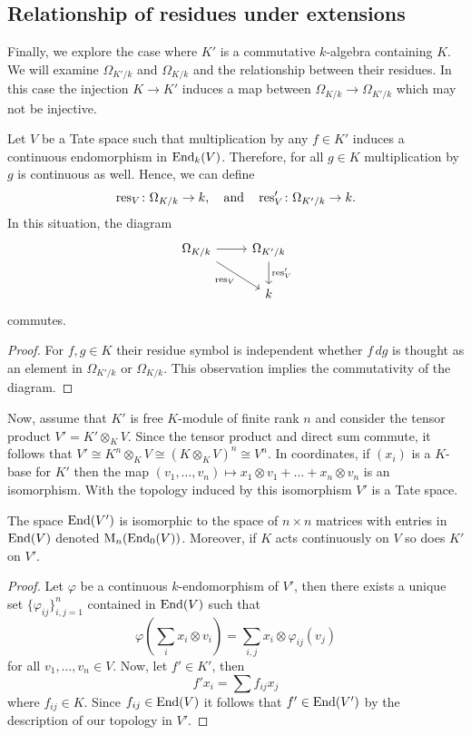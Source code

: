 \subsection{Relationship of residues under extensions}
Finally, we explore the case where $K'$ is a commutative $k$-algebra containing $K$. We will examine $\Omega_{K'/k}$ and $\Omega_{K/k}$ and the relationship between their residues. In this case the injection $K \to K'$ induces a map between $\Omega_{K/k} \to \Omega_{K'/k}$ which may not be injective. 
\begin{proposition}\label{prop:residue-commutes-extension}
	Let $V$ be a Tate space such that multiplication by any $f\in K'$ induces a continuous endomorphism in $\operatorname{End}_{k}(V)$. Therefore, for all $g\in K$ multiplication by $g$ is continuous as well. Hence, we can define
\[
	\operatorname{res}_{V}\colon\Omega_{K/k} \to k, \quad\text{and}\quad \operatorname{res}_{V}'\colon \Omega_{K'/k}\to k.
\]
In this situation, the diagram
\[
\begin{tikzcd}
	\Omega_{K/k} \arrow[r] \arrow[dr, swap, "\res_{V}"] & \Omega_{K'/k} \arrow[d, "\res_{V}'"] \\
	& k  
\end{tikzcd}
\]
commutes.
\end{proposition}
\begin{proof}
	For $f,g \in K$ their residue symbol is independent whether $f\,dg$ is thought as an element in $\Omega_{K'/k}$ or $\Omega_{K/k}$. This observation implies the commutativity of the diagram.
\end{proof}
Now, assume that $K'$ is free $K$-module of finite rank $n$ and consider the tensor product $V' = K' \otimes_{K} V$. Since the tensor product and direct sum commute, it follows that $V' \cong K^{n} \otimes_{K} V \cong (K \otimes_{K} V)^{n}\cong V^{n}$. In coordinates, if $(x_{i})$ is a $K$-base for $K'$ then the map $(v_{1}, \ldots, v_{n}) \mapsto x_{1}\otimes v_{1} + \ldots + x_{n}\otimes v_{n}$ is an isomorphism. With the topology induced by this isomorphism $V'$ is a Tate space.
\begin{proposition}\label{prop:identification-matrices-entries-in-endomorphisms}
	The space $\operatorname{End}(V')$ is isomorphic to the space of $n \times n$ matrices with entries in $\operatorname{End}(V)$ denoted $\operatorname{M}_{n}(\operatorname{End}_{0}(V))$. Moreover, if $K$ acts continuously on $V$ so does $K'$ on $V'$.
\end{proposition}
\begin{proof}
	Let $\varphi$ be a continuous $k$-endomorphism of $V'$, then there exists a unique set $\{\varphi_{ij}\}_{i,j=1}^{n}$ contained in $\operatorname{End}(V)$ such that
	\[
	\varphi\left(\sum_{i} x_{i} \otimes v_{i}\right) = \sum_{i,j} x_{i} \otimes \varphi_{ij}(v_{j})
	\]
	for all $v_{1}, \ldots, v_{n} \in V$. Now, let $f' \in K'$, then
	\[
		f'x_{i} = \sum f_{ij}x_{j}
	\]
	where $f_{ij}\in K$. Since $f_{ij}\in\operatorname{End}(V)$ it follows that $f' \in \operatorname{End}(V')$ by the description of our topology in $V'$.
\end{proof}
